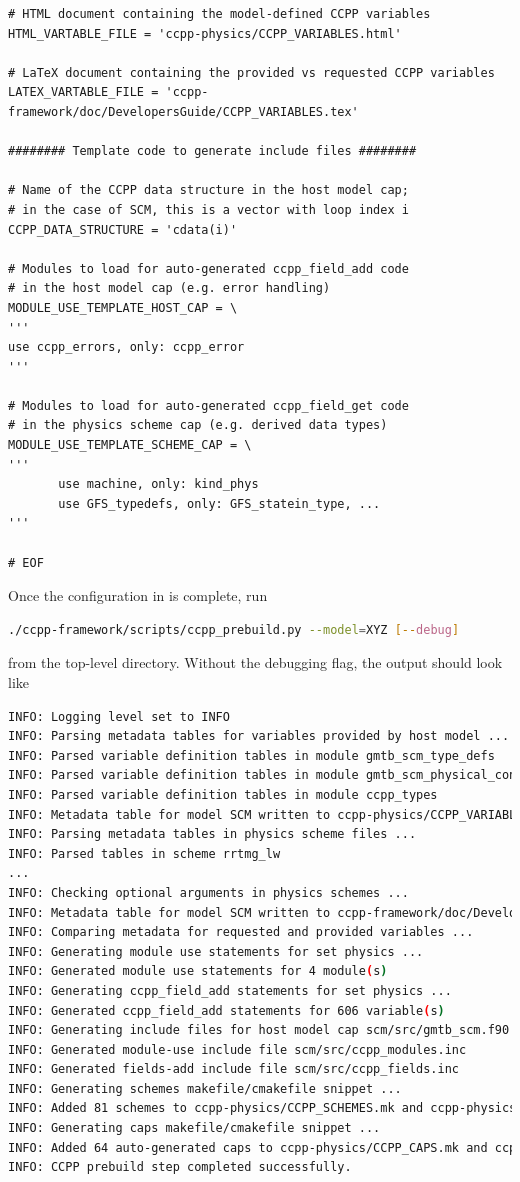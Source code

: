 \begin{lstlisting}
# HTML document containing the model-defined CCPP variables
HTML_VARTABLE_FILE = 'ccpp-physics/CCPP_VARIABLES.html'

# LaTeX document containing the provided vs requested CCPP variables
LATEX_VARTABLE_FILE = 'ccpp-framework/doc/DevelopersGuide/CCPP_VARIABLES.tex'

######## Template code to generate include files ########

# Name of the CCPP data structure in the host model cap;
# in the case of SCM, this is a vector with loop index i
CCPP_DATA_STRUCTURE = 'cdata(i)'

# Modules to load for auto-generated ccpp_field_add code
# in the host model cap (e.g. error handling)
MODULE_USE_TEMPLATE_HOST_CAP = \
'''
use ccpp_errors, only: ccpp_error
'''

# Modules to load for auto-generated ccpp_field_get code
# in the physics scheme cap (e.g. derived data types)
MODULE_USE_TEMPLATE_SCHEME_CAP = \
'''
       use machine, only: kind_phys
       use GFS_typedefs, only: GFS_statein_type, ...
'''

# EOF
\end{lstlisting}
\clearpage

Once the configuration in  is complete, run
\begin{lstlisting}[language=bash]
./ccpp-framework/scripts/ccpp_prebuild.py --model=XYZ [--debug]
\end{lstlisting}
from the top-level directory. Without the debugging flag, the output should look like
\begin{lstlisting}[language=bash,basicstyle=\scriptsize\ttfamily]
INFO: Logging level set to INFO
INFO: Parsing metadata tables for variables provided by host model ...
INFO: Parsed variable definition tables in module gmtb_scm_type_defs
INFO: Parsed variable definition tables in module gmtb_scm_physical_constants
INFO: Parsed variable definition tables in module ccpp_types
INFO: Metadata table for model SCM written to ccpp-physics/CCPP_VARIABLES_SCM.html
INFO: Parsing metadata tables in physics scheme files ...
INFO: Parsed tables in scheme rrtmg_lw
...
INFO: Checking optional arguments in physics schemes ...
INFO: Metadata table for model SCM written to ccpp-framework/doc/DevelopersGuide/CCPP_VARIABLES_SCM.tex
INFO: Comparing metadata for requested and provided variables ...
INFO: Generating module use statements for set physics ...
INFO: Generated module use statements for 4 module(s)
INFO: Generating ccpp_field_add statements for set physics ...
INFO: Generated ccpp_field_add statements for 606 variable(s)
INFO: Generating include files for host model cap scm/src/gmtb_scm.f90 ...
INFO: Generated module-use include file scm/src/ccpp_modules.inc
INFO: Generated fields-add include file scm/src/ccpp_fields.inc
INFO: Generating schemes makefile/cmakefile snippet ...
INFO: Added 81 schemes to ccpp-physics/CCPP_SCHEMES.mk and ccpp-physics/CCPP_SCHEMES.cmake
INFO: Generating caps makefile/cmakefile snippet ...
INFO: Added 64 auto-generated caps to ccpp-physics/CCPP_CAPS.mk and ccpp-physics/CCPP_CAPS.cmake
INFO: CCPP prebuild step completed successfully.
\end{lstlisting}

